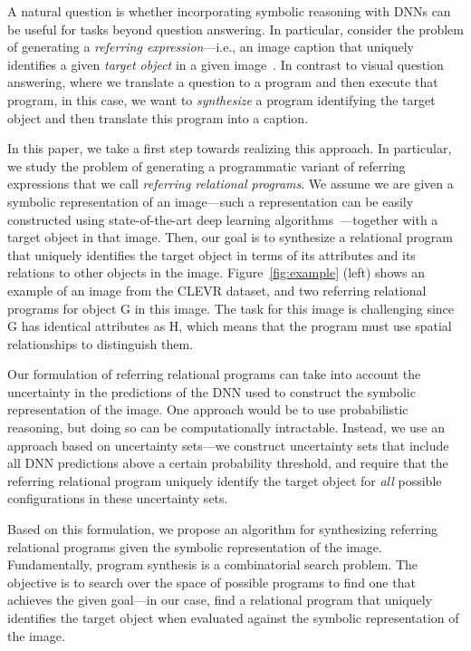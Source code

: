 A natural question is whether incorporating symbolic reasoning with DNNs can be useful for tasks beyond question answering. In particular, consider the problem of generating a \emph{referring expression}---i.e., an image caption that uniquely identifies a given \emph{target object} in a given image~\cite{golland2010game,kazemzadeh2014referitgame}. In contrast to visual question answering, where we translate a question to a program and then execute that program, in this case, we want to \emph{synthesize} a program identifying the target object and then translate this program into a caption.

In this paper, we take a first step towards realizing this approach. In particular, we study the problem of generating a programmatic variant of referring expressions that we call \emph{referring relational programs}. We assume we are given a symbolic representation of an image---such a representation can be easily constructed using state-of-the-art deep learning algorithms~\cite{redmon2016you,krishna2017visual,yi2018neural,mao2019neuro}---together with a target object in that image. Then, our goal is to synthesize a relational program that uniquely identifies the target object in terms of its attributes and its relations to other objects in the image. Figure~\ref{fig:example} (left) shows an example of an image from the CLEVR dataset, and two referring relational programs for object G in this image. The task for this image is challenging since G has identical attributes as H, which means that the program must use spatial relationships to distinguish them.

Our formulation of referring relational programs can take into account the uncertainty in the predictions of the DNN used to construct the symbolic representation of the image. One approach would be to use probabilistic reasoning, but doing so can be computationally intractable. Instead, we use an approach based on uncertainty sets---we construct uncertainty sets that include all DNN predictions above a certain probability threshold, and require that the referring relational program uniquely identify the target object for \emph{all} possible configurations in these uncertainty sets.

Based on this formulation, we propose an algorithm for synthesizing referring relational programs
given the symbolic representation of the image. Fundamentally, program synthesis is a combinatorial search problem. The objective is to search over the space of possible programs to find one that achieves the given goal---in our case, find a relational program that uniquely identifies the target object when evaluated against the symbolic representation of the image.

